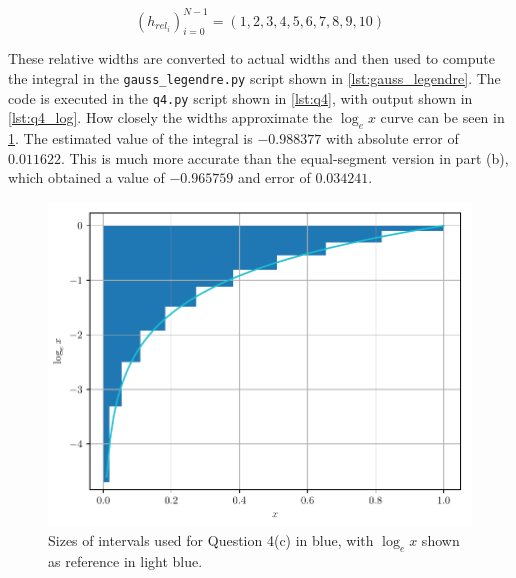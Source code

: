 \documentclass[a4paper,titlepage]{article}
\newcommand{\code}[1]{\texttt{#1}}
\begin{document}
	\begin{equation} \label{eq:relative_widths}
		(h_{rel_i})_{i=0}^{N-1} = (1, 2, 3, 4, 5, 6, 7, 8, 9, 10)
	\end{equation}
	
	These relative widths are converted to actual widths and then used to compute the integral in the \code{gauss\_legendre.py} script shown in \cref{lst:gauss_legendre}. The code is executed in the \code{q4.py} script shown in \cref{lst:q4}, with output shown in \cref{lst:q4_log}.	How closely the widths approximate the $\log_e x$ curve can be seen in \cref{fig:q4c}. The estimated value of the integral is $-0.988377$ with absolute error of $0.011622$. This is much more accurate than the equal-segment version in part (b), which obtained a value of $-0.965759$ and error of $0.034241$.
	
	\begin{figure}[!htb]
		\centering
		\includegraphics[width=\columnwidth]{plots/q4c.pdf}
		\caption
		{Sizes of intervals used for Question 4(c) in blue, with $\log_e x$ shown as reference in light blue.}
		\label{fig:q4c}
	\end{figure}

	\onecolumn
	
\end{document}
